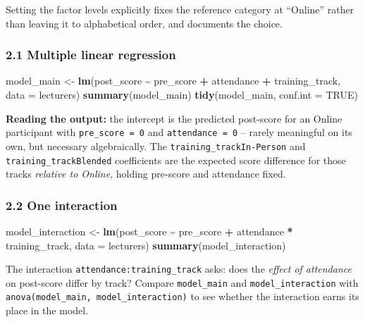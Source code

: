 \documentclass[11pt]{article}
\newenvironment{Shaded}{\begin{snugshade}}{\end{snugshade}}
\newcommand{\AttributeTok}[1]{\textcolor[rgb]{0.13,0.29,0.53}{#1}}
\newcommand{\ConstantTok}[1]{\textcolor[rgb]{0.56,0.35,0.01}{#1}}
\newcommand{\FunctionTok}[1]{\textcolor[rgb]{0.13,0.29,0.53}{\textbf{#1}}}
\newcommand{\NormalTok}[1]{#1}
\newcommand{\OtherTok}[1]{\textcolor[rgb]{0.56,0.35,0.01}{#1}}
\newcommand{\SpecialCharTok}[1]{\textcolor[rgb]{0.81,0.36,0.00}{\textbf{#1}}}
\begin{document}
Setting the factor levels explicitly fixes the reference category at
``Online'' rather than leaving it to alphabetical order, and documents
the choice.

\hypertarget{multiple-linear-regression}{%
\subsubsection{2.1 Multiple linear
regression}\label{multiple-linear-regression}}

\begin{Shaded}
\begin{Highlighting}[]
\NormalTok{model\_main }\OtherTok{\textless{}{-}} \FunctionTok{lm}\NormalTok{(post\_score }\SpecialCharTok{\textasciitilde{}}\NormalTok{ pre\_score }\SpecialCharTok{+}\NormalTok{ attendance }\SpecialCharTok{+}\NormalTok{ training\_track, }\AttributeTok{data =}\NormalTok{ lecturers)}
\FunctionTok{summary}\NormalTok{(model\_main)}
\FunctionTok{tidy}\NormalTok{(model\_main, }\AttributeTok{conf.int =} \ConstantTok{TRUE}\NormalTok{)}
\end{Highlighting}
\end{Shaded}

\textbf{Reading the output:} the intercept is the predicted post-score
for an Online participant with \texttt{pre\_score\ =\ 0} and
\texttt{attendance\ =\ 0} -- rarely meaningful on its own, but necessary
algebraically. The \texttt{training\_trackIn-Person} and
\texttt{training\_trackBlended} coefficients are the expected score
difference for those tracks \emph{relative to Online}, holding pre-score
and attendance fixed.

\hypertarget{one-interaction}{%
\subsubsection{2.2 One interaction}\label{one-interaction}}

\begin{Shaded}
\begin{Highlighting}[]
\NormalTok{model\_interaction }\OtherTok{\textless{}{-}} \FunctionTok{lm}\NormalTok{(post\_score }\SpecialCharTok{\textasciitilde{}}\NormalTok{ pre\_score }\SpecialCharTok{+}\NormalTok{ attendance }\SpecialCharTok{*}\NormalTok{ training\_track, }\AttributeTok{data =}\NormalTok{ lecturers)}
\FunctionTok{summary}\NormalTok{(model\_interaction)}
\end{Highlighting}
\end{Shaded}

The interaction \texttt{attendance:training\_track} asks: does the
\emph{effect of attendance} on post-score differ by track? Compare
\texttt{model\_main} and \texttt{model\_interaction} with
\texttt{anova(model\_main,\ model\_interaction)} to see whether the
interaction earns its place in the model.
\end{document}
